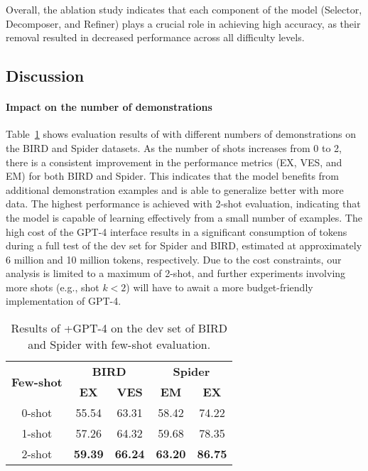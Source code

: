 Overall, the ablation study indicates that each component of the \ours{} model (Selector, Decomposer, and Refiner) plays a crucial role in achieving high accuracy, as their removal resulted in decreased performance across all difficulty levels.

\subsection{Discussion}

\paragraph{Impact on the number of demonstrations} 
Table~\ref{tab:few-shot} shows evaluation results of \ours{} with different numbers of demonstrations on the BIRD and Spider datasets. 
As the number of shots increases from 0 to 2, there is a consistent improvement in the performance metrics (EX, VES, and EM) for both BIRD and Spider. 
This indicates that the model benefits from additional demonstration examples and is able to generalize better with more data. 
The highest performance is achieved with 2-shot evaluation, indicating that the model is capable of learning effectively from a small number of examples.
The high cost of the GPT-4 interface results in a significant consumption of tokens during a full test of the dev set for Spider and BIRD, estimated at approximately 6 million and 10 million tokens, respectively.
Due to the cost constraints, our analysis is limited to a maximum of 2-shot, and further experiments involving more shots (e.g., shot $k < 2$) will have to await a more budget-friendly implementation of GPT-4. 

\begin{table}[]
\centering
\begin{tabular}{@{}ccccc@{}}
\toprule
\multicolumn{1}{c}{\multirow{2}{*}{\textbf{Few-shot}}} & \multicolumn{2}{c}{\textbf{BIRD}} & \multicolumn{2}{c}{\textbf{Spider}} \\ \cmidrule(l){2-5} 
\multicolumn{1}{c}{}                                   & \textbf{EX}     & \textbf{VES}    & \textbf{EM}      & \textbf{EX}      \\ \cmidrule(r){1-5}
0-shot                                                 & 55.54           & 63.31           & 58.42            & 74.22            \\
1-shot                                                 & 57.26           & 64.32           & 59.68            & 78.35            \\
2-shot                                                 & \textbf{59.39}  & \textbf{66.24}  & \textbf{63.20}   & \textbf{86.75}   \\ \bottomrule
\end{tabular}
\caption{Results of \ours{}+GPT-4 on the dev set of BIRD and Spider with few-shot evaluation.}
\label{tab:few-shot}
\end{table}

